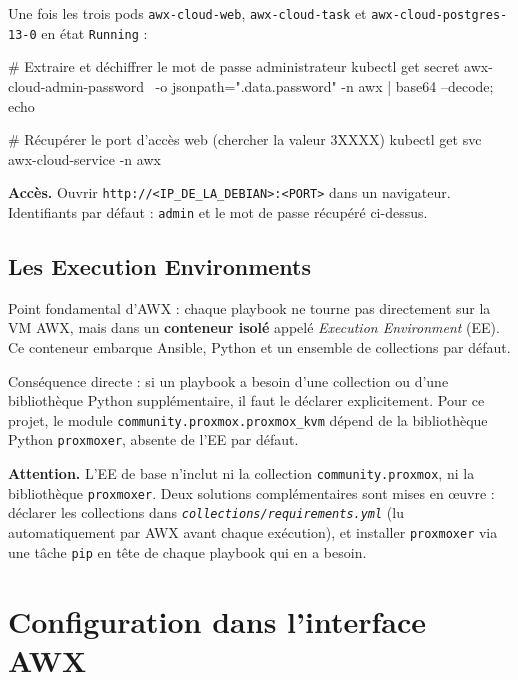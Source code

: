 \documentclass[a4paper]{article}
\newcommand{\cmd}[1]{\texttt{#1}}
\newcommand{\file}[1]{\texttt{\textit{#1}}}
\begin{document}
Une fois les trois pods \cmd{awx-cloud-web}, \cmd{awx-cloud-task} et \cmd{awx-cloud-postgres-13-0} en état \cmd{Running} :

\begin{bashcode}
# Extraire et déchiffrer le mot de passe administrateur
kubectl get secret awx-cloud-admin-password \
  -o jsonpath="{.data.password}" -n awx | base64 --decode; echo

# Récupérer le port d'accès web (chercher la valeur 3XXXX)
kubectl get svc awx-cloud-service -n awx
\end{bashcode}

\begin{infobox}
  \textbf{Accès.} Ouvrir \cmd{http://<IP\_DE\_LA\_DEBIAN>:<PORT>} dans un navigateur. Identifiants par défaut : \cmd{admin} et le mot de passe récupéré ci-dessus.
\end{infobox}

\subsection{Les Execution Environments}

Point fondamental d'AWX : chaque playbook ne tourne pas directement sur la VM AWX, mais dans un \textbf{conteneur isolé} appelé \textit{Execution Environment} (EE). Ce conteneur embarque Ansible, Python et un ensemble de collections par défaut.

Conséquence directe : si un playbook a besoin d'une collection ou d'une bibliothèque Python supplémentaire, il faut le déclarer explicitement. Pour ce projet, le module \cmd{community.proxmox.proxmox\_kvm} dépend de la bibliothèque Python \cmd{proxmoxer}, absente de l'EE par défaut.

\begin{warnbox}
  \textbf{Attention.} L'EE de base n'inclut ni la collection \cmd{community.proxmox}, ni la bibliothèque \cmd{proxmoxer}. Deux solutions complémentaires sont mises en œuvre : déclarer les collections dans \file{collections/requirements.yml} (lu automatiquement par AWX avant chaque exécution), et installer \cmd{proxmoxer} via une tâche \cmd{pip} en tête de chaque playbook qui en a besoin.
\end{warnbox}


\section{Configuration dans l'interface AWX}
\end{document}
